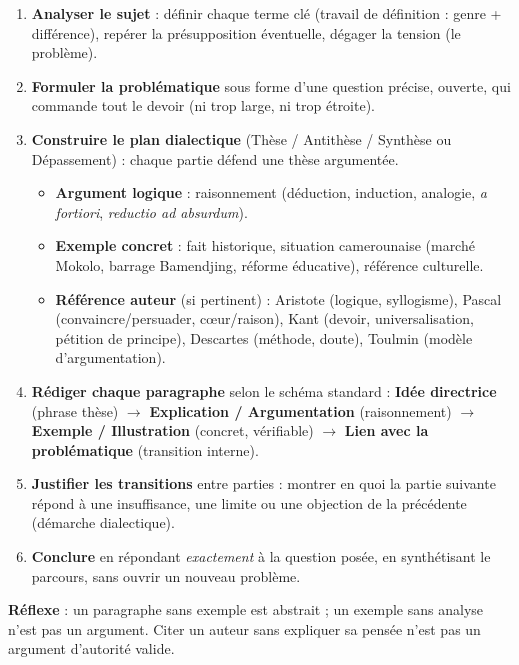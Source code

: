 \documentclass[11pt]{article}
\newcommand{\cle}[1]{{\popxbold\color{popdark}#1}}
\begin{document}
\begin{methode}
\begin{enumerate}
\item \textbf{Analyser le sujet} : définir chaque terme clé (travail de \cle{définition} : genre + différence), repérer la présupposition éventuelle, dégager la tension (le problème).
\item \textbf{Formuler la problématique} sous forme d'une question précise, ouverte, qui commande tout le devoir (ni trop large, ni trop étroite).
\item \textbf{Construire le plan dialectique} (Thèse / Antithèse / Synthèse ou Dépassement) : chaque partie défend une thèse argumentée.
  \begin{itemize}
  \item \textbf{Argument logique} : raisonnement (déduction, induction, analogie, \emph{a fortiori}, \emph{reductio ad absurdum}).
  \item \textbf{Exemple concret} : fait historique, situation camerounaise (marché Mokolo, barrage Bamendjing, réforme éducative), référence culturelle.
  \item \textbf{Référence auteur} (si pertinent) : Aristote (logique, syllogisme), Pascal (convaincre/persuader, cœur/raison), Kant (devoir, universalisation, pétition de principe), Descartes (méthode, doute), Toulmin (modèle d'argumentation).
  \end{itemize}
\item \textbf{Rédiger chaque paragraphe} selon le schéma standard : \textbf{Idée directrice} (phrase thèse) $\rightarrow$ \textbf{Explication / Argumentation} (raisonnement) $\rightarrow$ \textbf{Exemple / Illustration} (concret, vérifiable) $\rightarrow$ \textbf{Lien avec la problématique} (transition interne).
\item \textbf{Justifier les transitions} entre parties : montrer en quoi la partie suivante répond à une insuffisance, une limite ou une objection de la précédente (démarche dialectique).
\item \textbf{Conclure} en répondant \emph{exactement} à la question posée, en synthétisant le parcours, sans ouvrir un nouveau problème.
\end{enumerate}
\textbf{Réflexe} : un paragraphe sans exemple est abstrait ; un exemple sans analyse n'est pas un argument. Citer un auteur sans expliquer sa pensée n'est pas un argument d'autorité valide.
\end{methode}
\end{document}
